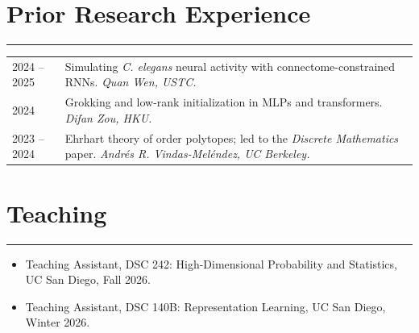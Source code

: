 \documentclass[11pt]{article}
\begin{document}
\section*{Prior Research Experience}
\hrule
\noindent\begin{tabularx}{\textwidth}{@{}p{5.5em}X@{}}
2024 -- 2025 & Simulating \textit{C. elegans} neural activity with connectome-constrained RNNs. \textit{Quan Wen, USTC.} \\[2pt]
2024 & Grokking and low-rank initialization in MLPs and transformers. \textit{Difan Zou, HKU.} \\[2pt]
2023 -- 2024 & Ehrhart theory of order polytopes; led to the \textit{Discrete Mathematics} paper. \textit{Andrés R. Vindas-Meléndez, UC Berkeley.} \\
\end{tabularx}

\section*{Teaching}
\hrule
\begin{itemize}[leftmargin=1.5em, topsep=2pt, partopsep=0pt, itemsep=0pt, parsep=0pt]
    \item Teaching Assistant, DSC 242: High-Dimensional Probability and Statistics, UC San Diego, Fall 2026.
    \item Teaching Assistant, DSC 140B: Representation Learning, UC San Diego, Winter 2026.
\end{itemize}
\end{document}
